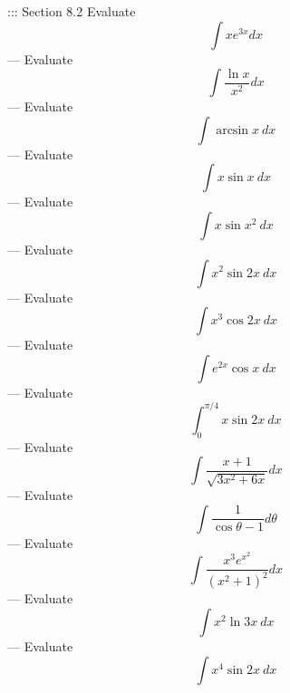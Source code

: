 ::: Section 8.2
Evaluate
\[\int xe^{3x}dx\]
---
Evaluate
\[\int\frac{\ln x}{x^2}dx\]
---
Evaluate
\[\int\arcsin x\ dx\]
---
Evaluate
\[\int x\sin x\ dx\]
---
Evaluate
\[\int x\sin x^2\ dx\]
---
Evaluate
\[\int x^2\sin 2x\ dx\]
---
Evaluate
\[\int x^3\cos 2x\ dx\]
---
Evaluate
\[\int e^{2x}\cos x\ dx\]
---
Evaluate
\[\int_0^{\pi/4}x\sin 2x\ dx\]
---
Evaluate
\[\int\frac{x+1}{\sqrt{3x^2+6x}}dx\]
---
Evaluate
\[\int\frac{1}{\cos\theta -1}d\theta\]
---
Evaluate
\[\int\frac{x^3e^{x^2}}{(x^2+1)^2}dx\]
---
Evaluate
\[\int x^2\ln 3x\ dx\]
---
Evaluate
\[\int x^4\sin 2x\ dx\]
